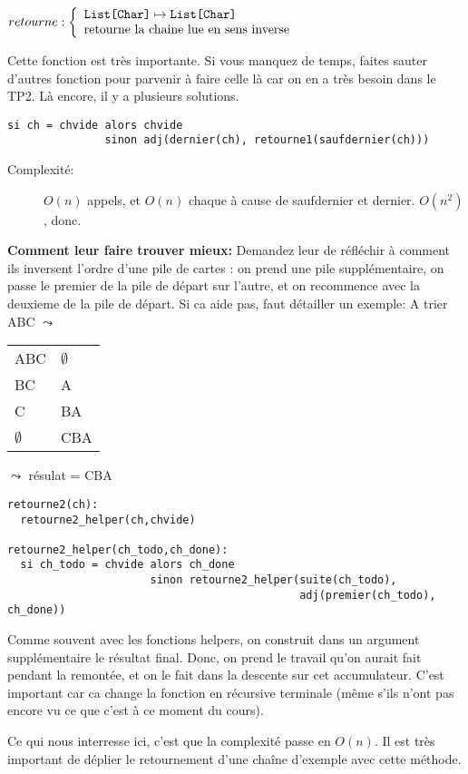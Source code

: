 \documentclass[10pt]{article}\usepackage[nu]{esial}
\begin{document}
\begin{Question}
  $retourne: \left\{
    \begin{array}{l}
      \text{\texttt{List[Char]}}\mapsto \text{\texttt{List[Char]}}\\
      \text{retourne la chaine lue en sens inverse}
    \end{array}\right.$  
\end{Question}
\begin{Reponse}
  Cette fonction est très importante. Si vous manquez de temps, faites sauter
  d'autres fonction pour parvenir à faire celle là car on en a très besoin dans
  le TP2. Là encore, il y a plusieurs solutions.
  \begin{Verbatim}[label=retourne(ch) -- version bourinne]
si ch = chvide alors chvide
               sinon adj(dernier(ch), retourne1(saufdernier(ch)))
  \end{Verbatim}
  \begin{description}
  \item[Complexité:] $O(n)$ appels, et $O(n)$ chaque à cause de saufdernier et
    dernier. $O(n^2)$, donc.
  \end{description}
  
  \textbf{Comment leur faire trouver mieux:} Demandez leur de réfléchir à
  comment ils inversent l'ordre d'une pile de cartes : on prend une pile
  supplémentaire, on passe le premier de la pile de départ sur l'autre, et on
  recommence avec la deuxieme de la pile de départ. Si ca aide pas, faut
  détailler un exemple:
  A trier ABC $\leadsto$ \begin{tabular}{|l l|}\hline
    ABC&$\emptyset$\\
    BC&A\\
    C&BA\\
    $\emptyset$&CBA\\\hline
  \end{tabular}$\leadsto$ résulat = CBA

  \begin{Verbatim}[label=retourne(ch) -- avec helper]
retourne2(ch):
  retourne2_helper(ch,chvide)

retourne2_helper(ch_todo,ch_done):
  si ch_todo = chvide alors ch_done
                      sinon retourne2_helper(suite(ch_todo),
                                             adj(premier(ch_todo), ch_done))
  \end{Verbatim}
  Comme souvent avec les fonctions helpers, on construit dans un argument
  supplémentaire le résultat final. Donc, on prend le travail qu'on aurait fait
  pendant la remontée, et on le fait dans la descente sur cet
  accumulateur. C'est important car ca change la fonction en récursive
  terminale (même s'ils n'ont pas encore vu ce que c'est à ce moment du cours).

  Ce qui nous interresse ici, c'est que la complexité passe en $O(n)$. Il est
  très important de déplier le retournement d'une chaîne d'exemple avec cette
  méthode. 

\end{Reponse}
\end{document}
